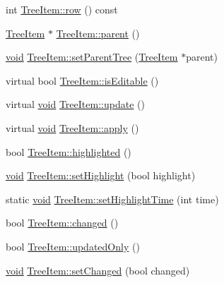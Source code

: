 \begin{DoxyCompactItemize}
\item 
int \hyperlink{group___u_a_v_object_browser_plugin_ga5a062d24b35421360ad1d101c564e9be}{\-Tree\-Item\-::row} () const 
\item 
\hyperlink{class_tree_item}{\-Tree\-Item} $\ast$ \hyperlink{group___u_a_v_object_browser_plugin_gaa3a7ba624312b6be70872634db291881}{\-Tree\-Item\-::parent} ()
\item 
\hyperlink{group___u_a_v_objects_plugin_ga444cf2ff3f0ecbe028adce838d373f5c}{void} \hyperlink{group___u_a_v_object_browser_plugin_gab0eb64f28a5cd5d9e77ff4579014b1bb}{\-Tree\-Item\-::set\-Parent\-Tree} (\hyperlink{class_tree_item}{\-Tree\-Item} $\ast$parent)
\item 
virtual bool \hyperlink{group___u_a_v_object_browser_plugin_ga6d83a2fdf1599b2be263c94ad5b05e83}{\-Tree\-Item\-::is\-Editable} ()
\item 
virtual \hyperlink{group___u_a_v_objects_plugin_ga444cf2ff3f0ecbe028adce838d373f5c}{void} \hyperlink{group___u_a_v_object_browser_plugin_gab6c763d5ea39c359ab56b4d8b1af8f7b}{\-Tree\-Item\-::update} ()
\item 
virtual \hyperlink{group___u_a_v_objects_plugin_ga444cf2ff3f0ecbe028adce838d373f5c}{void} \hyperlink{group___u_a_v_object_browser_plugin_gaca25a01ba924019208f39d7c7ae2f593}{\-Tree\-Item\-::apply} ()
\item 
bool \hyperlink{group___u_a_v_object_browser_plugin_ga47c7c59b2ed66695e9c42351fbeb24b2}{\-Tree\-Item\-::highlighted} ()
\item 
\hyperlink{group___u_a_v_objects_plugin_ga444cf2ff3f0ecbe028adce838d373f5c}{void} \hyperlink{group___u_a_v_object_browser_plugin_ga59e306591cb8099a247f47cde3e4e78a}{\-Tree\-Item\-::set\-Highlight} (bool highlight)
\item 
static \hyperlink{group___u_a_v_objects_plugin_ga444cf2ff3f0ecbe028adce838d373f5c}{void} \hyperlink{group___u_a_v_object_browser_plugin_ga75de400d0bd7ba687fcc1535a3a0f871}{\-Tree\-Item\-::set\-Highlight\-Time} (int time)
\item 
bool \hyperlink{group___u_a_v_object_browser_plugin_ga092f37d4eb04a9889985eadb5066ff6e}{\-Tree\-Item\-::changed} ()
\item 
bool \hyperlink{group___u_a_v_object_browser_plugin_gae407428df05b1f28bcb6e8bf2cd86b73}{\-Tree\-Item\-::updated\-Only} ()
\item 
\hyperlink{group___u_a_v_objects_plugin_ga444cf2ff3f0ecbe028adce838d373f5c}{void} \hyperlink{group___u_a_v_object_browser_plugin_ga2562126b279261daaf87d6234bfb807c}{\-Tree\-Item\-::set\-Changed} (bool changed)

\end{DoxyCompactItemize}
